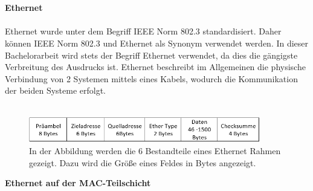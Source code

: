 \\
\\
\textbf{Ethernet}
\\
\\
Ethernet wurde unter dem Begriff \gls{IEEE} Norm 802.3 standardisiert. Daher können \gls{IEEE} Norm 802.3 und Ethernet als Synonym verwendet werden. In dieser Bachelorarbeit wird stets der Begriff Ethernet verwendet, da dies die gängigste Verbreitung des Ausdrucks ist. Ethernet beschreibt im Allgemeinen die physische Verbindung von 2 Systemen mittels eines Kabels, wodurch die Kommunikation der beiden Systeme erfolgt.\\
\\
\begin{figure}
	\centering
	\includegraphics[width=0.9\textwidth]{images/Ethernet_Rahmen.PNG}
	\caption[Felder eines Ethernet Rahmen]{In der Abbildung werden die 6 Bestandteile eines Ethernet Rahmen gezeigt. Dazu wird die Größe eines Feldes in Bytes angezeigt. }
	\label{img:Rahmen}
\end{figure}\textbf{Ethernet auf der MAC-Teilschicht}\\
\\\label{sec: Ethernet auf der MAC-Teilschicht}
